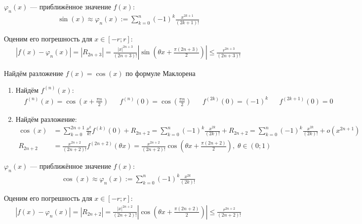 \documentclass{article}
\begin{document}
$\varphi_{n}(x)$ --- приближённое значение $f(x)$:
\begin{align*}
	\sin(x)\approx\varphi_{n}(x):=\sum_{k=0}^{n}(-1)^{k}\frac{x^{2k+1}}{(2k+1)!}
\end{align*}

Оценим его погрешность для $x\in[-r;r]$:
\begin{align*}
	|f(x)-\varphi_{n}(x)|=|R_{2n+3}|=\frac{|x|^{2n+3}}{(2n+3)!}\left|\sin\left(\theta x+\frac{\pi (2n+3)}{2}\right)\right|\leq\frac{r^{2n+3}}{(2n+3)!}
\end{align*}

\pagebreak


Найдём разложение $f(x)=\cos(x)$ по формуле Маклорена

\begin{enumerate}
	\item{}Найдём $f^{(n)}(x)$:
	\begin{align*}
		 & f^{(n)}(x)=\cos\left(x+\frac{\pi n}{2}\right) &  & f^{(n)}(0)=\cos\left(\frac{\pi n}{2}\right) &  & f^{(2k)}(0)=(-1)^{k} &  & f^{(2k+1)}(0)=0
	\end{align*}
	\item{}Найдём разложение:
	\begin{align*}
		\cos(x)  & =\sum_{k=0}^{2n+1}\frac{x^{k}}{k!}f^{(k)}(0)+R_{2n+2}=\sum_{k=0}^{n}(-1)^{k}\frac{x^{2k}}{(2k)!}+R_{2n+2}
		=\sum_{k=0}^{n}(-1)^{k}\frac{x^{2k}}{(2k)!}+o(x^{2n+1})                                                                                          \\
		R_{2n+2} & =\frac{x^{2n+2}}{(2n+2)!}f^{(2n+2)}(\theta x)=\frac{x^{2n+2}}{(2n+2)!}\cos\left(\theta x+\frac{\pi (2n+2)}{2}\right),\;\theta\in(0;1)
	\end{align*}
\end{enumerate}

$\varphi_{n}(x)$ --- приближённое значение $f(x)$:
\begin{align*}
	\cos(x)\approx\varphi_{n}(x):=\sum_{k=0}^{n}(-1)^{k}\frac{x^{2k}}{(2k)!}
\end{align*}

Оценим его погрешность для $x\in[-r;r]$:
\begin{align*}
	|f(x)-\varphi_{n}(x)|=|R_{2n+2}|=\frac{|x|^{2n+2}}{(2n+2)!}\left|\cos\left(\theta x+\frac{\pi (2n+2)}{2}\right)\right|\leq\frac{r^{2n+2}}{(2n+2)!}
\end{align*}

\end{document}
